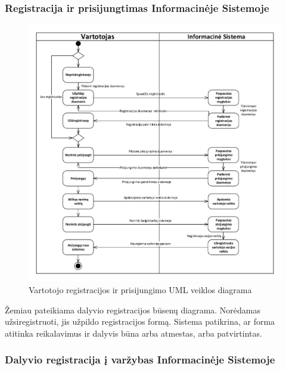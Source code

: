 \documentclass{VUMIFPSkursinis}
\begin{document}
		\subsubsection*{Registracija ir prisijungtimas Informacinėje Sistemoje}
		
		\begin{figure}[H]
			\centering
			\includegraphics[width=\textwidth]{img/VeiklosDiagrama1}
			\caption{Vartotojo registracijos ir prisijungimo UML veiklos diagrama}
			\label{fig:VartotojoRegistracijosIrPrisijungimoUMLVeiklosDiagrama}
		\end{figure}
		
		Žemiau pateikiama dalyvio registracijos būsenų diagrama. 
		Norėdamas užsiregistruoti, jis užpildo registracijos formą. 
		Sistema patikrina, ar forma atitinka reikalavimus ir dalyvis būna arba atmestas, arba patvirtintas.
		
		\subsubsection*{Dalyvio registracija į varžybas Informacinėje Sistemoje}
		
\end{document}

